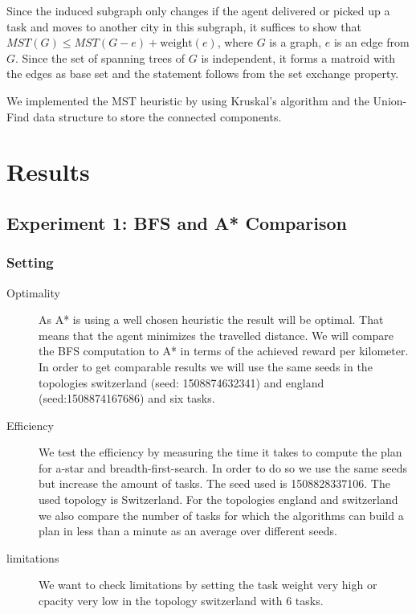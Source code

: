 \documentclass[11pt]{article}
\begin{document}
Since the induced subgraph only changes if the agent delivered or picked up a task and moves to another city in this subgraph, it suffices to show that $MST(G) \leq MST(G - e) + \mathrm{weight}(e)$, where $G$ is a graph, $e$ is an edge from $G$.
Since the set of spanning trees of $G$ is independent, it forms a matroid with the edges as base set and the statement follows from the set exchange property.

We implemented the MST heuristic by using Kruskal's algorithm and the Union-Find data structure to store the connected components.


\section{Results}

\subsection{Experiment 1: BFS and A* Comparison}




\subsubsection{Setting}
\begin{description}
	\item [Optimality] As A* is using a well chosen heuristic the result will be optimal. That means that the agent minimizes the travelled distance. We will compare the BFS computation to A* in terms of the achieved reward per kilometer. In order to get comparable results we will use the same seeds in the topologies switzerland (seed: 1508874632341) and england (seed:1508874167686) and six tasks. 
	\item[Efficiency] We test the efficiency by measuring the time it takes to compute the plan for a-star and breadth-first-search. In order to do so we use the same seeds but increase the amount of tasks. The seed used is 1508828337106. The used topology is Switzerland.
For the topologies england and switzerland we also compare the number of tasks for which the algorithms can build a plan in less than a minute as an average over different seeds.
	\item[limitations] We want to check limitations by setting the task weight very high or cpacity very low in the topology switzerland with 6 tasks.
\end{description}
\end{document}
